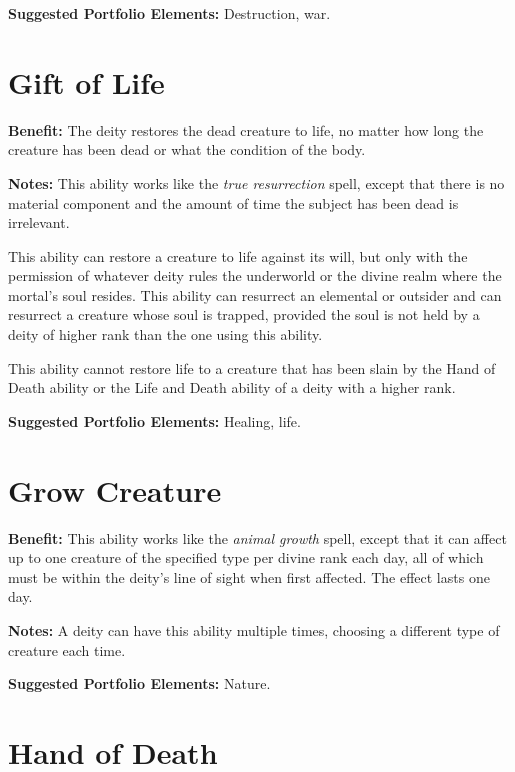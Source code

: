 \documentclass{article}
\begin{document}
\textbf{Suggested Portfolio Elements:} Destruction, war.

\vspace{12pt}
\section*{Gift of Life}

\textbf{Benefit:} The deity restores the dead creature to life, no matter how long 
the creature has been dead or what the condition of the body.

\textbf{Notes:} This ability works like the \textit{true resurrection }spell, except 
that there is no material component and the amount of time the subject has been 
dead is irrelevant.

This ability can restore a creature to life against its will, but only with the 
permission of whatever deity rules the underworld or the divine realm where the 
mortal's soul resides. This ability can resurrect an elemental or outsider and 
can resurrect a creature whose soul is trapped, provided the soul is not held by 
a deity of higher rank than the one using this ability.

This ability cannot restore life to a creature that has been slain by the Hand 
of Death ability or the Life and Death ability of a deity with a higher rank.

\textbf{Suggested Portfolio Elements:} Healing, life.

\vspace{12pt}
\section*{Grow Creature}

\textbf{Benefit:} This ability works like the \textit{animal growth }spell, except 
that it can affect up to one creature of the specified type per divine rank each 
day, all of which must be within the deity's line of sight when first affected. 
The effect lasts one day.

\textbf{Notes:} A deity can have this ability multiple times, choosing a different 
type of creature each time.

\textbf{Suggested Portfolio Elements:} Nature.

\vspace{12pt}
\section*{Hand of Death}
\end{document}
